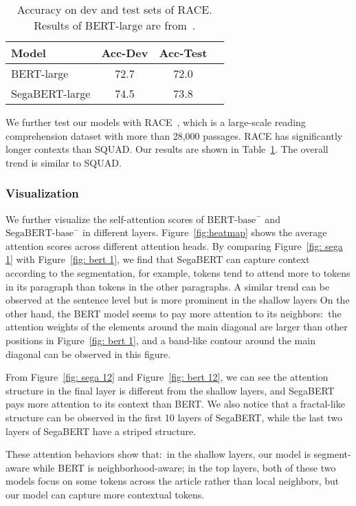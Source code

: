 \documentclass[letterpaper]{article}
\begin{document}
\begin{table}[t]\centering
  \small
  \begin{tabular}{lccc}\toprule
  Model&Acc-Dev &Acc-Test \\\midrule
  BERT-large &72.7 &72.0 \\
  SegaBERT-large &74.5 &73.8 \\
  \bottomrule
  \end{tabular}
  \caption{Accuracy on dev and test sets of RACE. Results of BERT-large are from~\citet{DBLP:conf/acl-mrqa/PanSYCJCY19}.}
  \label{tab: race}
  \end{table} 
We further test our models with RACE~\citep{DBLP:conf/emnlp/LaiXLYH17}, which is a large-scale reading comprehension dataset with more than 28,000 passages. 
RACE has significantly longer contexts than SQUAD.
Our results are shown in Table~\ref{tab: race}.
The overall trend is similar to SQUAD.






\subsubsection{Visualization}


We further visualize the self-attention scores of $\text{BERT-base}^{-}$ and $\text{SegaBERT-base}^{-}$ in different layers. 
Figure~\ref{fig:heatmap} shows the average attention scores across different attention heads. 
By comparing Figure~\ref{fig: sega 1} with Figure~\ref{fig: bert 1}, we find that SegaBERT can capture context according to the segmentation, for example, tokens tend to attend more to tokens in its paragraph than tokens in the other paragraphs. 
A similar trend can be observed at the sentence level but is more prominent in the shallow layers
On the other hand, the BERT model seems to pay more attention to its neighbors:\ the attention weights of the elements around the main diagonal are larger than other positions in Figure~\ref{fig: bert 1}, and a band-like contour around the main diagonal can be observed in this figure.

From Figure~\ref{fig: sega 12} and Figure~\ref{fig: bert 12}, we can see the attention structure in the final layer is different from the shallow layers, and SegaBERT pays more attention to its context than BERT.
We also notice that a fractal-like structure can be observed in the first 10 layers of SegaBERT, while the last two layers of SegaBERT have a striped structure.

These attention behaviors show that:\ in the shallow layers, our model is segment-aware while BERT is neighborhood-aware; 
in the top layers, both of these two models focus on some tokens across the article rather than local neighbors, but our model can capture more contextual tokens.
\end{document}

